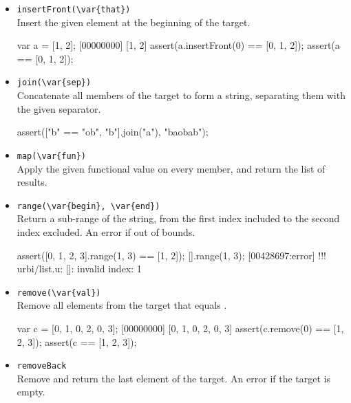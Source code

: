 \begin{itemize}
\item \lstinline|insertFront(\var{that})|\\
Insert the given element at the beginning of the target.

\begin{urbiscript}[firstnumber=last]
var a = [1, 2];
[00000000] [1, 2]
assert(a.insertFront(0) == [0, 1, 2]);
assert(a == [0, 1, 2]);
\end{urbiscript}

\item \lstinline|join(\var{sep})|\\
Concatenate all members of the target to form a string, separating
them with the given separator.

\begin{urbiscript}[firstnumber=last]
assert(["b" == "ob", "b"].join("a"), "baobab");
\end{urbiscript}

\item \lstinline|map(\var{fun})|\\
Apply the given functional value on every member, and return the list
of results.


\item \lstinline|range(\var{begin}, \var{end})|\\
Return a sub-range of the string, from the first index included to the
second index excluded. An error if out of bounds.

\begin{urbiscript}[firstnumber=last]
assert([0, 1, 2, 3].range(1, 3) == [1, 2]);
[].range(1, 3);
[00428697:error] !!! urbi/list.u: []: invalid index: 1
\end{urbiscript}

\item \lstinline|remove(\var{val})|\\
Remove all elements from the target that equals .

\begin{urbiscript}[firstnumber=last]
var c = [0, 1, 0, 2, 0, 3];
[00000000] [0, 1, 0, 2, 0, 3]
assert(c.remove(0) == [1, 2, 3]);
assert(c == [1, 2, 3]);
\end{urbiscript}

\item \lstinline|removeBack|\\
Remove and return the last element of the target. An error if the
target is empty.


\end{itemize}
